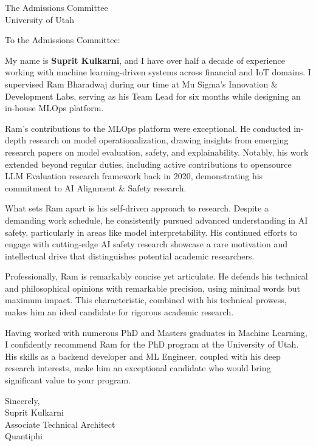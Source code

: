 \documentclass[11pt]{letter}
\begin{document}
\begin{letter}{The Admissions Committee \\ University of Utah}
\opening{To the Admissions Committee:}

My name is \textbf{Suprit Kulkarni}, and I have over half a decade of experience working with machine learning-driven systems across financial and IoT domains. I supervised Ram Bharadwaj during our time at Mu Sigma's Innovation \& Development Labs, serving as his Team Lead for six months while designing an in-house MLOps platform.

Ram's contributions to the MLOps platform were exceptional. He conducted in-depth research on model operationalization, drawing insights from emerging research papers on model evaluation, safety, and explainability. Notably, his work extended beyond regular duties, including active contributions to opensource LLM Evaluation research framework back in 2020, demonstrating his commitment to AI Alignment \& Safety research.

What sets Ram apart is his self-driven approach to research. Despite a demanding work schedule, he consistently pursued advanced understanding in AI safety, particularly in areas like model interpretability. His continued efforts to engage with cutting-edge AI safety research showcase a rare motivation and intellectual drive that distinguishes potential academic researchers.

Professionally, Ram is remarkably concise yet articulate. He defends his technical and philosophical opinions with remarkable precision, using minimal words but maximum impact. This characteristic, combined with his technical prowess, makes him an ideal candidate for rigorous academic research.

Having worked with numerous PhD and Masters graduates in Machine Learning, I confidently recommend Ram for the PhD program at the University of Utah. His skills as a backend developer and ML Engineer, coupled with his deep research interests, make him an exceptional candidate who would bring significant value to your program.

\closing{Sincerely,\\[4pt]
Suprit Kulkarni\\
Associate Technical Architect\\
Quantiphi}

\end{letter}
\end{document}
